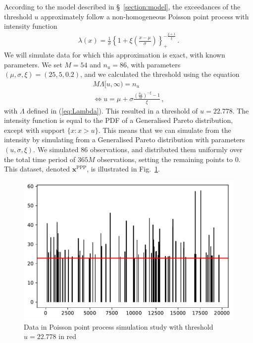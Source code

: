 \documentclass{article}
\begin{document}
%
According to the model described in \S~\ref{section:model},
the exceedances of the threshold $u$ approximately
follow a non-homogeneous Poisson point process with intensity function
%
\begin{align*}
	\lambda(x) = \frac{1}{\sigma}
		\left\{1 + \xi \left(\frac{x - \mu}{\sigma}\right)\right\}_+
		^ {-\frac{\xi + 1}{\xi}} \,.
\end{align*}
%
We will simulate data for which this approximation is exact,
with known parameters.
We set $M = 54$ and $n_u = 86$,
with parameters $(\mu, \sigma, \xi)=(25, 5, 0.2)$,
and we calculated the threshold using the equation
%
\begin{align*}
	M \Lambda[u, \infty) = n_u \\
	\iff u = \mu + \sigma \frac{\left(\frac{n_u}{M}\right)
		^ {-\xi} - 1}{\xi} \,,
\end{align*}
%
with $\Lambda$ defined in (\ref{eq:Lambda}).
This resulted in a threshold of $u = 22.778$.
The intensity function is equal to the PDF
of a Generalised Pareto distribution,
except with support $\{x\colon x>u\}$.
This means that we can simulate from the intensity
by simulating from a Generalised Pareto distribution
with parameters $(u, \sigma, \xi)$.
We simulated 86 observations, and distributed them uniformly
over the total time period of $365 M$ observations,
setting the remaining points to $0$.
This dataset, denoted $\mathbf{x}^{\text{PPP}}$,
is illustrated in Fig.~\ref{fig:ppp-data}.
%
\begin{figure}
	\centering
	\includegraphics[width=0.7\linewidth]{../plots/ppp-data.pdf}
	\caption{Data in Poisson point process simulation study with
		threshold $u = 22.778$ in red}
	\label{fig:ppp-data}
\end{figure}
%
\end{document}
